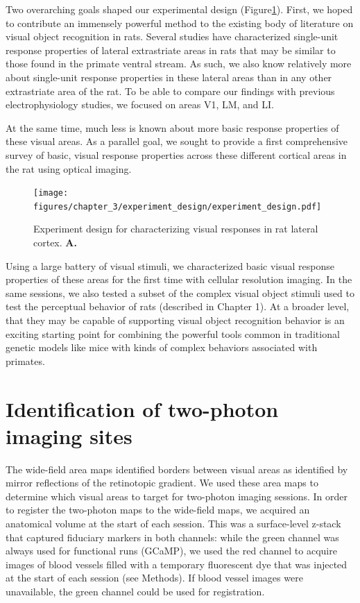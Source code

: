 Two overarching goals shaped our experimental design (Figure\ref{fig:experiment_design}). First, we hoped to contribute an immensely powerful method to the existing body of literature on visual object recognition in rats. Several studies have characterized single-unit response properties of lateral extrastriate areas in rats that may be similar to those found in the primate ventral stream\cite{Tafazoli2017, Vermaercke2014, VinkenX, Vermaerke2015}. As such, we also know relatively more about single-unit response properties in these lateral areas than in any other extrastriate area of the rat\cite{Vermaercke2014, Tafazoli2017, Vinken2016, REFREF}. To be able to compare our findings with previous electrophysiology studies, we focused on areas V1, LM, and LI. 

At the same time, much less is known about more basic response properties of these visual areas. As a parallel goal, we sought to provide a first comprehensive survey of basic, visual response properties across these different cortical areas in the rat using optical imaging. 

\begin{figure}
    \texttt{[image: figures/chapter\_3/experiment\_design/experiment\_design.pdf]}
    \vspace{.1in}
    \caption[Experiment design]{Experiment design for characterizing visual responses in rat lateral cortex. \textbf{A.} 
    \label{fig:experiment_design}}
\end{figure}

Using a large battery of visual stimuli, we characterized basic visual response properties of these areas for the first time with cellular resolution imaging. In the same sessions, we also tested a subset of the complex visual object stimuli used to test the perceptual behavior of rats (described in Chapter 1). At a broader level, that they may be capable of supporting visual object recognition behavior is an exciting starting point for combining the powerful tools common in traditional genetic models like mice with kinds of complex behaviors associated with primates.  

\section{Identification of two-photon imaging sites}
The wide-field area maps identified borders between visual areas as identified by mirror reflections of the retinotopic gradient. We used these area maps to determine which visual areas to target for two-photon imaging sessions. In order to register the two-photon maps to the wide-field maps, we acquired an anatomical volume at the start of each session. This was a surface-level z-stack that captured fiduciary markers in both channels: while the green channel was always used for functional runs (GCaMP), we used the red channel to acquire images of blood vessels filled with a temporary fluorescent dye that was injected at the start of each session (see Methods). If blood vessel images were unavailable, the green channel could be used for registration. 

